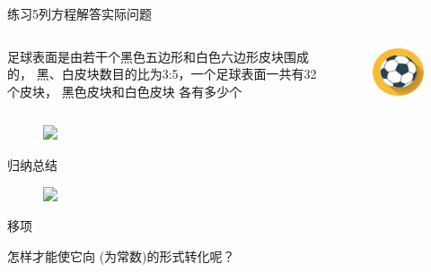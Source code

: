 \begin{frame}{练习5}{列方程解答实际问题}
    \begin{columns}
        \begin{block}{}
            \centering%
            足球表面是由若干个黑色五边形和白色六边形皮块围成的，
            黑、白皮块数目的比为3:5，一个足球表面一共有32个皮块，
            黑色皮块和白色皮块
            各有多少个
        \end{block}

        \begin{figure}
            \includegraphics[width=.55\textwidth]{assets/2.png}
        \end{figure}
    \end{columns} 
    \begin{figure}
        \includegraphics<2>[width=.9\textwidth]{assets/3.png}
    \end{figure}
\end{frame}

\begin{frame}{归纳总结}
    \begin{figure}
        \includegraphics<1>[width=.95\textwidth]{assets/1.png}
    \end{figure}
\end{frame}

\begin{frame}{移项}


        \vspace{1em}
        怎样才能使它向 (为常数)的形式转化呢？
\end{frame}

